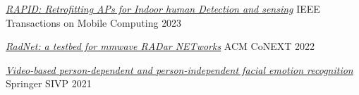 
\begin{cvhonors}

  \cvhonor
    {\href{https://ieeexplore.ieee.org/abstract/document/10172159}{\emph{RAPID: Retrofitting APs for Indoor human Detection and sensing}}} %
    {IEEE Transactions on Mobile Computing} %
    {} %
    {2023} %

  
  \cvhonor
    {\href{https://dl.acm.org/doi/abs/10.1145/3565474.3569068}{\emph{RadNet: a testbed for mmwave RADar NETworks}}} %
    {ACM CoNEXT} %
    {} %
    {2022} %
    

    

  \cvhonor
    {\href{https://link.springer.com/article/10.1007/s11760-020-01830-0}{\emph{Video-based person-dependent and person-independent facial emotion recognition}}} %
    {Springer SIVP} %
    {} %
    {2021} %
    

    
\end{cvhonors}
